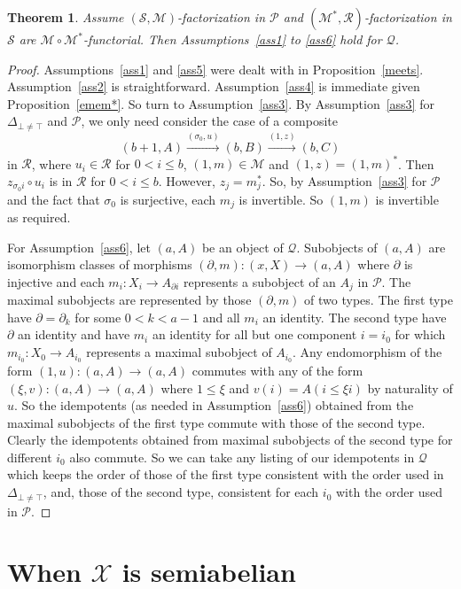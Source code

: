 \documentclass[a4paper,12pt,reqno]{amsart}
\newtheorem{theorem}{Theorem}[section] %
\theoremstyle{definition}
\theoremstyle{fact}
\theoremstyle{genquest}
\theoremstyle{step}
\newcommand{\lra}{\longrightarrow}
\newcommand{\ra}{\rightarrow}
\def\CM{{\mathscr M}}
\def\CP{{\mathscr P}}
\def\CQ{{\mathscr Q}}
\def\CR{{\mathscr R}}
\def\CS{{\mathscr S}}
\def\CX{{\mathscr X}}
\begin{document}
\begin{theorem}\label{constthm}
Assume $(\CS,\CM)$-factorization in $\CP$ and $(\CM^*,\CR)$-factorization 
in $\CS$ are $\CM\circ \CM^*$-functorial.
Then Assumptions~\ref{ass1} to \ref{ass6} hold for $\CQ$. 
\end{theorem}
\begin{proof}
Assumptions~\ref{ass1} and \ref{ass5} were dealt with in Proposition~\ref{meets}.
Assumption~\ref{ass2} is straightforward.
Assumption~\ref{ass4} is immediate given Proposition~\ref{emem*}.
So turn to Assumption~\ref{ass3}. 
By Assumption~\ref{ass3} for $\Delta_{\bot \neq \top}$ and $\CP$, we only need
consider the case of a composite 
$$(b+1,A)\stackrel{(\sigma_0,u)} \lra (b,B)\stackrel{(1,z)} \lra (b,C)$$ 
in $\CR$, where $u_i\in \CR$ for $0<i\le b$, 
$(1,m)\in \CM$ and $(1,z) = (1,m)^*$. 
Then $z_{\sigma_0i} \circ u_i$ is in $\CR$ for $0<i\le b$.
However, $z_j=m_j^*$. So, by Assumption~\ref{ass3} for $\CP$ and the fact that
$\sigma_0$ is surjective, each $m_j$ is invertible.  
So $(1,m)$ is invertible as required.   

For Assumption~\ref{ass6}, let $(a,A)$ be an object of $\CQ$. 
Subobjects of $(a,A)$ are isomorphism classes
of morphisms $(\partial, m) : (x,X)\ra (a,A)$ where $\partial$ is injective and each
$m_i: X_i \ra A_{\partial i}$ represents a subobject of an $A_j$ in $\CP$.
The maximal subobjects are represented by those $(\partial, m)$ of two types.
The first type have $\partial = \partial_k$ for some $0< k < a-1$ and all $m_i$ an identity. 
The second type have $\partial$ an identity and have $m_i$ an identity for all
but one component $i = i_0$ for which $m_{i_0}:X_0\ra A_{i_0}$ represents
a maximal subobject of $A_{i_0}$.
Any endomorphism of the form $(1,u):(a,A)\ra (a,A)$ commutes with any of the form
$(\xi,v):(a,A)\ra (a,A)$ where $1\le \xi$ and $v(i) = A(i\le \xi i)$ by naturality of $u$.
So the idempotents (as needed in Assumption~\ref{ass6}) obtained from the maximal subobjects of the first type commute with those of the second type.
Clearly the idempotents obtained from maximal subobjects of the second type
for different $i_0$ also commute.
So we can take any listing of our idempotents in $\CQ$ which keeps the order
of those of the first type consistent with the order used in $\Delta_{\bot\ne\top}$,
and, those of the second type, consistent for each $i_0$ with the order used in $\CP$.     
\end{proof}

\section{When $\CX$ is semiabelian}\label{semiabelian}
\end{document}
